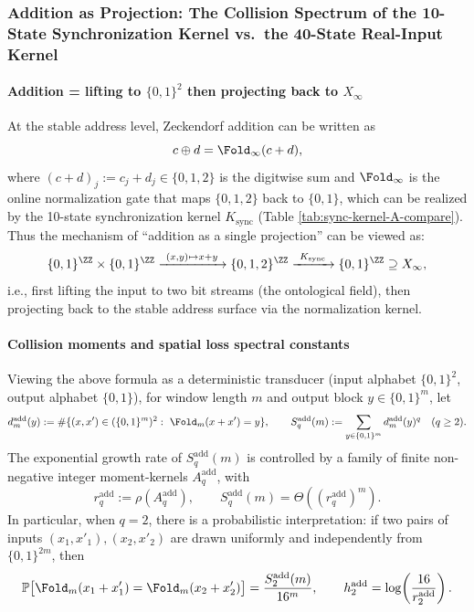 \subsubsection{Addition as Projection: The Collision Spectrum of the 10-State Synchronization Kernel vs.\ the 40-State Real-Input Kernel}\label{app:add-collision-spectrum}

\paragraph{Addition = lifting to \texorpdfstring{$\{0,1\}^2$}{\{0,1\}^2} then projecting back to \texorpdfstring{$X_\infty$}{X\_infty}}
At the stable address level, Zeckendorf addition can be written as
\[
c\oplus d=\Fold_\infty(c+d),
\]
where \((c+d)_j:=c_j+d_j\in\{0,1,2\}\) is the digitwise sum and \(\Fold_\infty\) is the online normalization gate that maps \(\{0,1,2\}\) back to \(\{0,1\}\), which can be realized by the 10-state synchronization kernel \(K_{\mathrm{sync}}\) (Table \ref{tab:sync-kernel-A-compare}).
Thus the mechanism of ``addition as a single projection'' can be viewed as:
\[
\{0,1\}^{\ZZ}\times\{0,1\}^{\ZZ}\xrightarrow{\ (x,y)\mapsto x+y\ }\{0,1,2\}^{\ZZ}\xrightarrow{\ K_{\mathrm{sync}}\ }\{0,1\}^{\ZZ}\supseteq X_\infty,
\]
i.e., first lifting the input to two bit streams (the ontological field), then projecting back to the stable address surface via the normalization kernel.

\paragraph{Collision moments and spatial loss spectral constants}
Viewing the above formula as a deterministic transducer (input alphabet \(\{0,1\}^2\), output alphabet \(\{0,1\}\)),
for window length \(m\) and output block \(y\in\{0,1\}^m\), let
\[
d^{\mathrm{add}}_m(y):=\#\{(x,x')\in(\{0,1\}^m)^2:\ \Fold_m(x+x')=y\},
\qquad
S^{\mathrm{add}}_q(m):=\sum_{y\in\{0,1\}^m}d^{\mathrm{add}}_m(y)^q\quad(q\ge 2).
\]
The exponential growth rate of \(S^{\mathrm{add}}_q(m)\) is controlled by a family of finite non-negative integer moment-kernels \(A^{\mathrm{add}}_q\), with
\[
r^{\mathrm{add}}_q:=\rho\!\left(A^{\mathrm{add}}_q\right),
\qquad
S^{\mathrm{add}}_q(m)=\Theta\!\left((r^{\mathrm{add}}_q)^m\right).
\]
In particular, when \(q=2\), there is a probabilistic interpretation: if two pairs of inputs \((x_1,x'_1),(x_2,x'_2)\) are drawn uniformly and independently from \(\{0,1\}^{2m}\), then
\[
\mathbb{P}\bigl[\Fold_m(x_1+x'_1)=\Fold_m(x_2+x'_2)\bigr]=\frac{S^{\mathrm{add}}_2(m)}{16^m},
\qquad
h^{\mathrm{add}}_2=\log\!\left(\frac{16}{r^{\mathrm{add}}_2}\right).
\]

